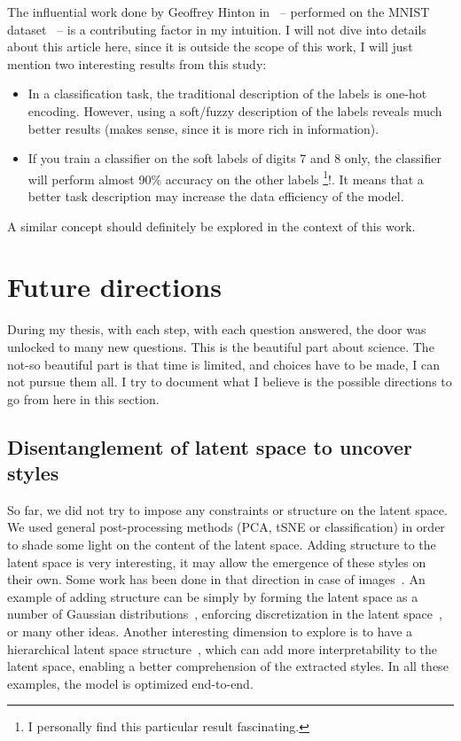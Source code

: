     The influential work done by Geoffrey Hinton in~\citep{hinton2015distilling} -- performed on the MNIST dataset~\citep{lecun-mnisthandwrittendigit-2010} -- is a contributing factor in my intuition. I will not dive into details about this article here, since it is outside the scope of this work, I will just mention two interesting results from this study:

    \begin{itemize}
        \item In a classification task, the traditional description of the labels is one-hot encoding. However, using a soft/fuzzy description of the labels reveals much better results (makes sense, since it is more rich in information).
        \item If you train a classifier on the soft labels of digits 7 and 8 only, the classifier will perform almost 90\% accuracy on the other labels \footnote{I personally find this particular result fascinating.}!. It means that a better task description may increase the data efficiency of the model.
    \end{itemize}
    A similar concept should definitely be explored in the context of this work.

\section{Future directions}\label{sec:future_direction}
  \par During my thesis, with each step, with each question answered, the door was unlocked to many new questions. This is the beautiful part about science. The not-so beautiful part is that time is limited, and choices have to be made, I can not pursue them all. I try to document what I believe is the possible directions to go from here in this section.

  \subsection{Disentanglement of latent space to uncover styles}
    \par So far, we did not try to impose any constraints or structure on the latent space. We used general post-processing methods (PCA, tSNE or classification) in order to shade some light on the content of the latent space. Adding structure to the latent space is very interesting, it may allow the emergence of these styles on their own. Some work has been done in that direction in case of images~\citep{higgins2017beta}. An example of adding structure can be simply by forming the latent space as a number of Gaussian distributions~\citep{kingma2013auto}, enforcing discretization in the latent space~\citep{jang2016categorical,maddison2016concrete,van2017neural}, or many other ideas. Another interesting dimension to explore is to have a hierarchical latent space structure~\citep{hsu2018hierarchical}, which can add more interpretability to the latent space, enabling a better comprehension of the extracted styles. In all these examples, the model is optimized end-to-end.

